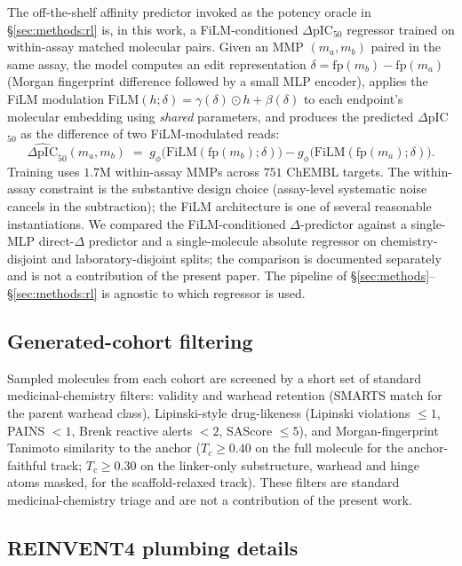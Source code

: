 The off-the-shelf affinity predictor invoked as the potency oracle in \S\ref{sec:methods:rl} is, in this work, a FiLM-conditioned $\Delta$pIC$_{50}$ regressor trained on within-assay matched molecular pairs. Given an MMP $(m_a, m_b)$ paired in the same assay, the model computes an edit representation $\delta = \mathrm{fp}(m_b) - \mathrm{fp}(m_a)$ (Morgan fingerprint difference followed by a small MLP encoder), applies the FiLM modulation $\mathrm{FiLM}(h; \delta) = \gamma(\delta) \odot h + \beta(\delta)$ to each endpoint's molecular embedding using \emph{shared} parameters, and produces the predicted $\Delta$pIC$_{50}$ as the difference of two FiLM-modulated reads:
\[
\widehat{\Delta\text{pIC}}_{50}(m_a, m_b) \;=\; g_\phi\bigl(\mathrm{FiLM}(\mathrm{fp}(m_b); \delta)\bigr) - g_\phi\bigl(\mathrm{FiLM}(\mathrm{fp}(m_a); \delta)\bigr).
\]
Training uses $1.7$M within-assay MMPs across $751$ ChEMBL targets. The within-assay constraint is the substantive design choice (assay-level systematic noise cancels in the subtraction); the FiLM architecture is one of several reasonable instantiations. We compared the FiLM-conditioned $\Delta$-predictor against a single-MLP direct-$\Delta$ predictor and a single-molecule absolute regressor on chemistry-disjoint and laboratory-disjoint splits; the comparison is documented separately and is not a contribution of the present paper. The pipeline of \S\ref{sec:methods}--\S\ref{sec:methods:rl} is agnostic to which regressor is used.

\subsection{Generated-cohort filtering}\label{sec:supp:filters}

Sampled molecules from each cohort are screened by a short set of standard medicinal-chemistry filters: validity and warhead retention (SMARTS match for the parent warhead class), Lipinski-style drug-likeness (Lipinski violations $\le 1$, PAINS $< 1$, Brenk reactive alerts $< 2$, SAScore $\le 5$), and Morgan-fingerprint Tanimoto similarity to the anchor ($T_c \ge 0.40$ on the full molecule for the anchor-faithful track; $T_c \ge 0.30$ on the linker-only substructure, warhead and hinge atoms masked, for the scaffold-relaxed track). These filters are standard medicinal-chemistry triage and are not a contribution of the present work.

\subsection{REINVENT4 plumbing details}\label{sec:supp:rl_plumbing}

